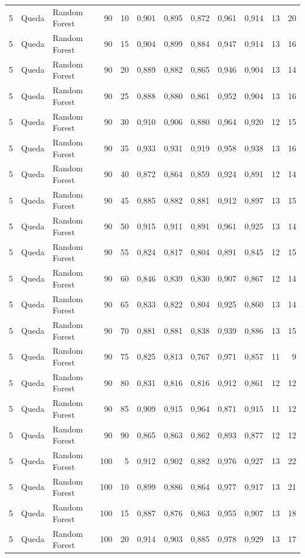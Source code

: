 \begin{longtable}{@{}rllrrrrrrrrr@{}}
5 & Queda & Random Forest & 90 & 10 & 0,901 & 0,895 & 0,872 & 0,961 & 0,914 & 13 & 20 \\
5 & Queda & Random Forest & 90 & 15 & 0,904 & 0,899 & 0,884 & 0,947 & 0,914 & 13 & 16 \\
5 & Queda & Random Forest & 90 & 20 & 0,889 & 0,882 & 0,865 & 0,946 & 0,904 & 13 & 14 \\
5 & Queda & Random Forest & 90 & 25 & 0,888 & 0,880 & 0,861 & 0,952 & 0,904 & 13 & 16 \\
5 & Queda & Random Forest & 90 & 30 & 0,910 & 0,906 & 0,880 & 0,964 & 0,920 & 12 & 15 \\
5 & Queda & Random Forest & 90 & 35 & 0,933 & 0,931 & 0,919 & 0,958 & 0,938 & 13 & 16 \\
5 & Queda & Random Forest & 90 & 40 & 0,872 & 0,864 & 0,859 & 0,924 & 0,891 & 12 & 14 \\
5 & Queda & Random Forest & 90 & 45 & 0,885 & 0,882 & 0,881 & 0,912 & 0,897 & 13 & 15 \\
5 & Queda & Random Forest & 90 & 50 & 0,915 & 0,911 & 0,891 & 0,961 & 0,925 & 13 & 14 \\
5 & Queda & Random Forest & 90 & 55 & 0,824 & 0,817 & 0,804 & 0,891 & 0,845 & 12 & 15 \\
5 & Queda & Random Forest & 90 & 60 & 0,846 & 0,839 & 0,830 & 0,907 & 0,867 & 12 & 14 \\
5 & Queda & Random Forest & 90 & 65 & 0,833 & 0,822 & 0,804 & 0,925 & 0,860 & 13 & 14 \\
5 & Queda & Random Forest & 90 & 70 & 0,881 & 0,881 & 0,838 & 0,939 & 0,886 & 13 & 15 \\
5 & Queda & Random Forest & 90 & 75 & 0,825 & 0,813 & 0,767 & 0,971 & 0,857 & 11 & 9 \\
5 & Queda & Random Forest & 90 & 80 & 0,831 & 0,816 & 0,816 & 0,912 & 0,861 & 12 & 12 \\
5 & Queda & Random Forest & 90 & 85 & 0,909 & 0,915 & 0,964 & 0,871 & 0,915 & 11 & 12 \\
5 & Queda & Random Forest & 90 & 90 & 0,865 & 0,863 & 0,862 & 0,893 & 0,877 & 12 & 12 \\
5 & Queda & Random Forest & 100 & 5 & 0,912 & 0,902 & 0,882 & 0,976 & 0,927 & 13 & 22 \\
5 & Queda & Random Forest & 100 & 10 & 0,899 & 0,886 & 0,864 & 0,977 & 0,917 & 13 & 21 \\
5 & Queda & Random Forest & 100 & 15 & 0,887 & 0,876 & 0,863 & 0,955 & 0,907 & 13 & 18 \\
5 & Queda & Random Forest & 100 & 20 & 0,914 & 0,903 & 0,885 & 0,978 & 0,929 & 13 & 17 \\

\end{longtable}
